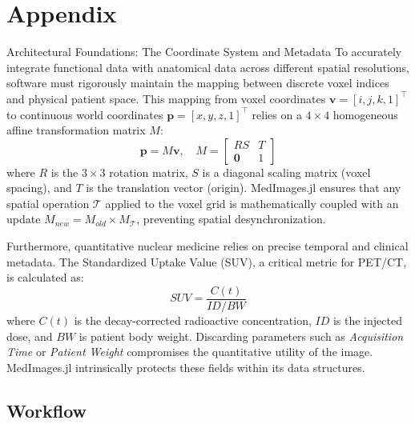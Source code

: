 \documentclass[a4paper,10pt]{elsarticle}
\begin{document}
\section{Appendix}

Architectural Foundations: The Coordinate System and Metadata
To accurately integrate functional data with anatomical data across different spatial resolutions, software must rigorously maintain the mapping between discrete voxel indices and physical patient space. This mapping from voxel coordinates $\mathbf{v} = [i, j, k, 1]^\top$ to continuous world coordinates $\mathbf{p} = [x, y, z, 1]^\top$ relies on a $4 \times 4$ homogeneous affine transformation matrix $M$:
\begin{equation}
\mathbf{p} = M \mathbf{v}, \quad M = 
\begin{bmatrix} 
R S & T \\
\mathbf{0} & 1
\end{bmatrix}
\end{equation}
where $R$ is the $3 \times 3$ rotation matrix, $S$ is a diagonal scaling matrix (voxel spacing), and $T$ is the translation vector (origin). MedImages.jl ensures that any spatial operation $\mathcal{T}$ applied to the voxel grid is mathematically coupled with an update $M_{new} = M_{old} \times M_{\mathcal{T}}$, preventing spatial desynchronization.

Furthermore, quantitative nuclear medicine relies on precise temporal and clinical metadata. The Standardized Uptake Value (SUV), a critical metric for PET/CT, is calculated as:
\begin{equation}
SUV = \frac{C(t)}{ID / BW}
\end{equation}
where $C(t)$ is the decay-corrected radioactive concentration, $ID$ is the injected dose, and $BW$ is patient body weight. Discarding parameters such as \textit{Acquisition Time} or \textit{Patient Weight} compromises the quantitative utility of the image. MedImages.jl intrinsically protects these fields within its data structures.

\subsection{Workflow}
\end{document}

